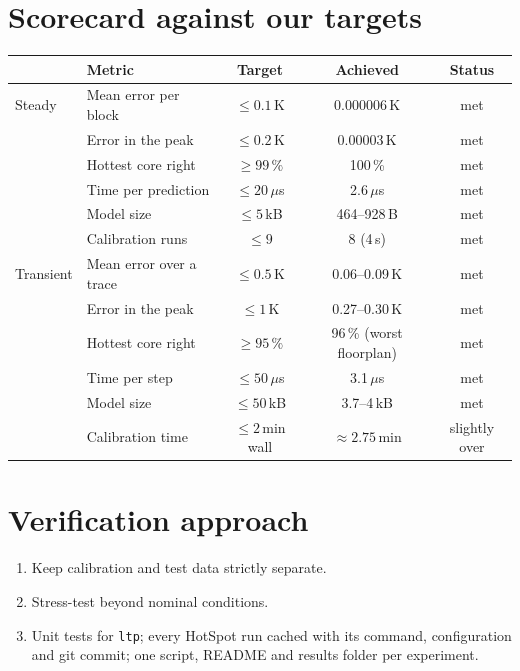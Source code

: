 \documentclass[11pt,a4paper]{article}
\newcommand{\us}{\,$\mu$s}
\begin{document}
\section{Scorecard against our targets}
\begin{center}
\small
\begin{tabular}{@{}l l c c c@{}}
\toprule
& Metric & Target & Achieved & Status \\
\midrule
Steady & Mean error per block & $\le 0.1$\,K & 0.000006\,K & met \\
& Error in the peak & $\le 0.2$\,K & 0.00003\,K & met \\
& Hottest core right & $\ge 99\,\%$ & 100\,\% & met \\
& Time per prediction & $\le 20$\us & 2.6\us & met \\
& Model size & $\le 5$\,kB & 464--928\,B & met \\
& Calibration runs & $\le 9$ & 8 (4\,s) & met \\
\midrule
Transient & Mean error over a trace & $\le 0.5$\,K & 0.06--0.09\,K & met \\
& Error in the peak & $\le 1$\,K & 0.27--0.30\,K & met \\
& Hottest core right & $\ge 95\,\%$ & 96\,\% (worst floorplan) & met \\
& Time per step & $\le 50$\us & 3.1\us & met \\
& Model size & $\le 50$\,kB & 3.7--4\,kB & met \\
& Calibration time & $\le 2$\,min wall & $\approx 2.75$\,min & slightly over \\
\bottomrule
\end{tabular}
\end{center}

\section{Verification approach}
\begin{enumerate}
  \item Keep calibration and test data strictly separate.
  \item Stress-test beyond nominal conditions.
  \item Unit tests for \texttt{ltp}; every HotSpot run cached with its command, configuration and
        git commit; one script, README and results folder per experiment.
\end{enumerate}
\end{document}
